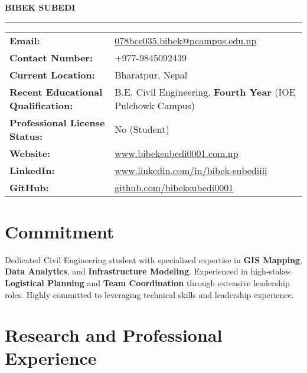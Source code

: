 \documentclass[letterpaper,10pt]{article}
\begin{document}
\begin{center}
    \Huge\bfseries \textbf{BIBEK SUBEDI}
\end{center}
\hrule height 1pt\vspace{2pt}

\noindent
\begin{tabularx}{\textwidth}{@{}l X}
\textbf{Email:} & \href{mailto:078bce035.bibek@pcampus.edu.np}{078bce035.bibek@pcampus.edu.np} \\
\textbf{Contact Number:} & +977-9845092439 \\
\textbf{Current Location:} & Bharatpur, Nepal  \\
\textbf{Recent Educational Qualification:} & B.E. Civil Engineering, \textbf{Fourth Year} (IOE Pulchowk Campus) \\
\textbf{Professional License Status:} & No (Student) \\
\textbf{Website:} & \href{https://bibeksubedi0001.com.np}{www.bibeksubedi0001.com.np} \\
\textbf{LinkedIn:} & \href{https://www.linkedin.com/in/bibek-subediiii/}{www.linkedin.com/in/bibek-subediiii} \\
\textbf{GitHub:} & \href{https://github.com/bibeksubedi0001}{github.com/bibeksubedi0001} \\
\end{tabularx}
\vspace{0.3cm}

\section*{Commitment}
\noindent Dedicated Civil Engineering student with specialized expertise in \textbf{GIS Mapping}, \textbf{Data Analytics}, and \textbf{Infrastructure Modeling}. Experienced in high-stakes \textbf{Logistical Planning} and \textbf{Team Coordination} through extensive leadership roles. Highly committed to leveraging technical skills and leadership experience.
\vspace{0.3cm}

\section*{Research and Professional Experience}
\end{document}
